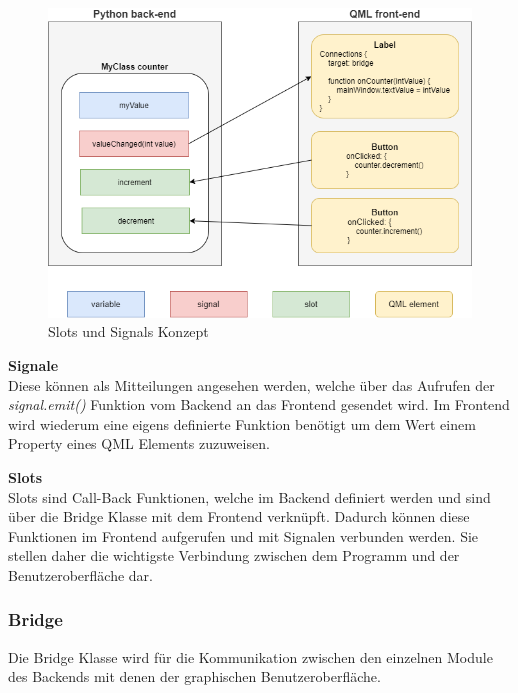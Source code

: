 \begin{figure}[H]
	\begin{center}
		\includegraphics[scale=0.4]{figures/hcis/signals_slots.png}
		\caption{Slots und Signals Konzept}
	\end{center}
\end{figure}

\textbf{Signale}\\ \medskip
Diese können als Mitteilungen angesehen werden, welche über das Aufrufen der \textit{signal.emit()} Funktion vom Backend an das Frontend gesendet wird. Im Frontend wird wiederum eine eigens definierte Funktion benötigt um dem Wert einem Property eines QML Elements zuzuweisen.
\medskip

\textbf{Slots}\\ \medskip
Slots sind Call-Back Funktionen, welche im Backend definiert werden und sind über die Bridge Klasse mit dem Frontend verknüpft. Dadurch können diese Funktionen im Frontend aufgerufen und mit Signalen verbunden werden. Sie stellen daher die wichtigste Verbindung zwischen dem Programm und der Benutzeroberfläche dar.

\newpage
	
\subsubsection{Bridge}

Die Bridge Klasse wird für die Kommunikation zwischen den einzelnen Module des Backends mit denen der graphischen Benutzeroberfläche. 


